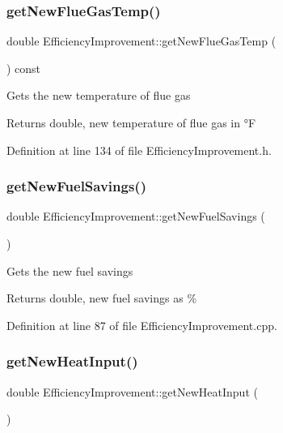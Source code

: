 \subsubsection{\texorpdfstring{get\+New\+Flue\+Gas\+Temp()}{getNewFlueGasTemp()}}
{\footnotesize\ttfamily double Efficiency\+Improvement\+::get\+New\+Flue\+Gas\+Temp (\begin{DoxyParamCaption}{ }\end{DoxyParamCaption}) const\hspace{0.3cm}{\ttfamily [inline]}}

Gets the new temperature of flue gas

\begin{DoxyReturn}{Returns}
double, new temperature of flue gas in °F 
\end{DoxyReturn}


Definition at line 134 of file Efficiency\+Improvement.\+h.

\mbox{\label{class_efficiency_improvement_a1b85007b7b046b998443f5eb267822f9}} 
\subsubsection{\texorpdfstring{get\+New\+Fuel\+Savings()}{getNewFuelSavings()}}
{\footnotesize\ttfamily double Efficiency\+Improvement\+::get\+New\+Fuel\+Savings (\begin{DoxyParamCaption}{ }\end{DoxyParamCaption})}

Gets the new fuel savings

\begin{DoxyReturn}{Returns}
double, new fuel savings as \% 
\end{DoxyReturn}


Definition at line 87 of file Efficiency\+Improvement.\+cpp.

\mbox{\label{class_efficiency_improvement_a89e8480c7d2477ee249e847d4669ee2e}} 
\subsubsection{\texorpdfstring{get\+New\+Heat\+Input()}{getNewHeatInput()}}
{\footnotesize\ttfamily double Efficiency\+Improvement\+::get\+New\+Heat\+Input (\begin{DoxyParamCaption}{ }\end{DoxyParamCaption})}

